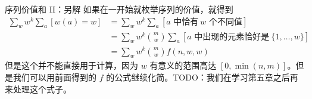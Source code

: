 \begin{frame}{序列价值和 II：另解}
    如果在一开始就枚举序列的价值，就得到
    $$
    \begin{aligned}
    \sum_w w^k\sum_a [w(a)=w]&=\sum_w w^k\sum_a [a\text{ 中恰有}\ w\text{ 个不同值}]\\
    &=\sum_w w^k\binom{m}{w}\sum_a[a\text{ 中出现的元素恰好是}\ \{1,\ldots,w\}]\\
    &=\sum_w w^k\binom{m}{w}f(n,w,w)
    \end{aligned}
    $$
    但是这个并不能直接用于计算，因为 $w$ 有意义的范围高达 $[0,\min(n,m)]$。但是我们可以用前面得到的 $f$ 的公式继续化简。TODO：我们在学习第五章之后再来处理这个式子。
\end{frame}
